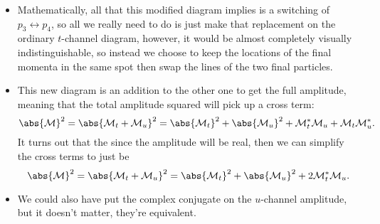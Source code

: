 \begin{itemize}
\begin{center}
        \end{center}
    \item Mathematically, all that this modified diagram implies is a switching of $p_3 \leftrightarrow p_4$, so all we really need to do is just make that replacement on the ordinary $t$-channel diagram, however, it would be almost completely visually indistinguishable, so instead we choose to keep the locations of the final momenta in the same spot then swap the lines of the two final particles.
    \item This new diagram is an addition to the other one to get the full amplitude, meaning that the total amplitude squared will pick up a cross term:
        \begin{equation*}
            \abs{\mathcal{M}}^2 = \abs{\mathcal{M}_t + \mathcal{M}_u}^2 = \abs{\mathcal{M}_t}^2 + \abs{\mathcal{M}_u}^2 + \mathcal{M}_t^*\mathcal{M}_u + \mathcal{M}_t\mathcal{M}_u^*.
        \end{equation*}
        It turns out that the since the amplitude will be real, then we can simplify the cross terms to just be
        \begin{equation*}
            \abs{\mathcal{M}}^2 = \abs{\mathcal{M}_t + \mathcal{M}_u}^2 = \abs{\mathcal{M}_t}^2 + \abs{\mathcal{M}_u}^2 + 2\mathcal{M}_t^*\mathcal{M}_u.
        \end{equation*}
    \item We could also have put the complex conjugate on the $u$-channel amplitude, but it doesn't matter, they're equivalent.
\end{itemize}